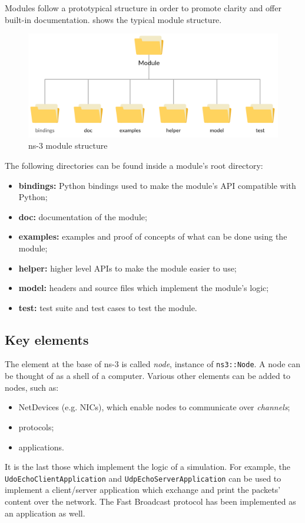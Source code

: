 	
	Modules follow a prototypical structure in order to promote clarity and offer built-in documentation.  shows the typical module structure.
	
	\begin{figure}[H]
		\centering
		\includegraphics[width=\textwidth]{immagini/ns-3-module}
		\caption{ns-3 module structure}
		\label{fig:ns-3-module}
	\end{figure}
	
	The following directories can be found inside a module's root directory:
	\begin{itemize}
		\item \textbf{bindings:} Python bindings used to make the module's API compatible with Python;
		\item \textbf{doc:} documentation of the module;
		\item \textbf{examples:} examples and proof of concepts of what can be done using the module;
		\item \textbf{helper:} higher level APIs to make the module easier to use;
		\item \textbf{model:} headers and source files which implement the module's logic; 
		\item \textbf{test:} test suite and test cases to test the module.
	\end{itemize}
	
	\subsection{Key elements}
	The element at the base of ns-3 is called \textit{node}, instance of \texttt{ns3::Node}. A node can be thought of as a shell of a computer. Various other elements can be added to nodes, such as:
	\begin{itemize}
		\item NetDevices (e.g. NICs), which enable nodes to communicate over \textit{channels};
		\item protocols;
		\item applications. 
	\end{itemize}
	It is the last those which implement the logic of a simulation. For example, the \texttt{UdoEchoClientApplication} and \texttt{UdpEchoServerApplication} can be used to implement a client/server application which exchange and print the packets' content over the network. The Fast Broadcast protocol has been implemented as an application as well.
	
